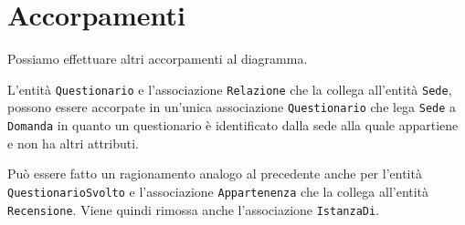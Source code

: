 \section{Accorpamenti}\label{sec:mergers}
Possiamo effettuare altri accorpamenti al diagramma.

\vspace{10pt}
L'entità {\tt Questionario} e l'associazione {\tt Relazione} che la collega all'entità {\tt Sede},
possono essere accorpate in un'unica associazione {\tt Questionario} che lega {\tt Sede}
a {\tt Domanda} in quanto un questionario è identificato dalla sede alla quale appartiene
e non ha altri attributi.

Può essere fatto un ragionamento analogo al precedente anche per l'entità {\tt QuestionarioSvolto}
e l'associazione {\tt Appartenenza} che la collega all'entità {\tt Recensione}. Viene
quindi rimossa anche l'associazione {\tt IstanzaDi}.
